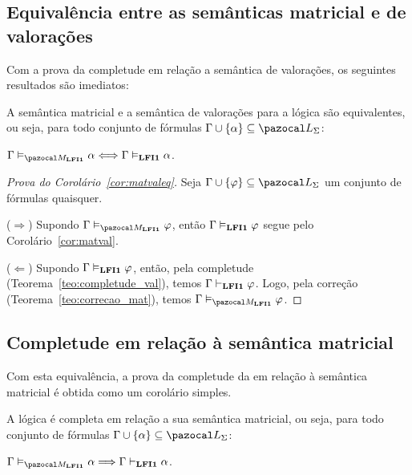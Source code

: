         \subsection{Equivalência entre as semânticas matricial e de valorações}\label{sec:equiv}
        Com a prova da completude em relação a semântica de valorações, os seguintes resultados são imediatos:

        \begin{corolario}\label{cor:matvaleq}
            A semântica matricial e a semântica de valorações para a lógica {\normalfont\lfium{}} são equivalentes, ou seja, para todo conjunto de fórmulas $\Gamma \cup \{\alpha\} \subseteq \ling{}$:

            \centering
            {\normalfont{} $\Gamma \conmat \alpha \Longleftrightarrow \Gamma \conval \alpha$.}

        \end{corolario}

        \begin{proof}[Prova do Corolário~\ref{cor:matvaleq}]
            Seja $\Gamma \cup \{\phi\} \subseteq \ling{}$ um conjunto de fórmulas quaisquer.

            \noindent ($\Longrightarrow$) Supondo $\Gamma \conmat \phi$, então $\Gamma \vDash_{{\normalfont\textbf{LFI1}}{}} \varphi$ segue pelo Corolário~\ref{cor:matval}.

            \noindent ($\Longleftarrow$) Supondo $\Gamma \vDash_{{\normalfont\textbf{LFI1}}{}} \varphi$, então, pela completude (Teorema~\ref{teo:completude_val}), temos $\Gamma \vdash_{{\normalfont\textbf{LFI1}}{}} \varphi$. Logo, pela correção (Teorema~\ref{teo:correcao_mat}), temos $\Gamma \conmat \phi$. \qedhere

        \end{proof}

        \subsection{Completude em relação à semântica matricial}\label{sec:comp_mat}
        
        Com esta equivalência, a prova da completude da \lfium{} em relação à semântica matricial é obtida como um corolário simples.


        \begin{corolario}\label{cor:completude_mat}
            A lógica {\normalfont\lfium{}} é completa em relação a sua semântica matricial, ou seja, para todo conjunto de fórmulas $\Gamma \cup \{\alpha\} \subseteq \ling{}$:

            \centering
            {\normalfont{} $\Gamma \conmat \alpha \Longrightarrow \Gamma \conhil \alpha$.}

        \end{corolario}

